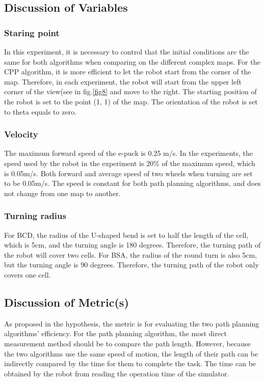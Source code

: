 \documentclass[conference]{IEEEtran}
\begin{document}
\subsection{Discussion of Variables}

\subsubsection{Staring point}
In this experiment, it is necessary to control that the initial conditions are the same for both algorithms when comparing on the different complex maps. For the CPP algorithm, it is more efficient to let the robot start from the corner of the map. Therefore, in each experiment, the robot will start from the upper left corner of the view(see in fig.\ref{fig8} and move to the right. The starting position of the robot is set to the point (1, 1) of the map. The orientation of the robot is set to theta equals to zero.

\subsubsection{Velocity}

The maximum forward speed of the e-puck is 0.25 m/s. In the experiments, the speed used by the robot in the experiment is 20$\%$ of the maximum speed, which is 0.05m/s. Both forward and average speed of two wheels when turning are set to be 0.05m/s. The speed is constant for both path planning algorithms, and does not change from one map to another. 

\subsubsection{Turning radius}

For BCD, the radius of the U-shaped bend is set to half the length of the cell, which is 5cm, and the turning angle is 180 degrees. Therefore, the turning path of the robot will cover two cells. For BSA, the radius of the round turn is also 5cm, but the turning angle is 90 degrees. Therefore, the turning path of the robot only covers one cell. 


\subsection{Discussion of Metric(s)}

As proposed in the hypothesis, the metric is for evaluating the two path planning algorithms' efficiency. For the path planning algorithm, the most direct measurement method should be to compare the path length. However, because the two algorithms use the same speed of motion, the length of their path can be indirectly compared by the time for them to complete the task. The time can be obtained by the robot from reading the operation time of the simulator.
\end{document}
